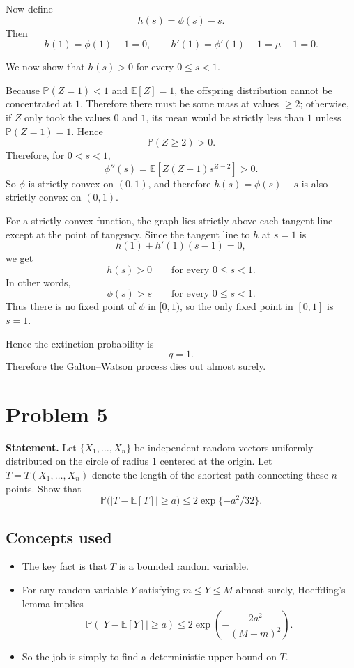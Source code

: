 \documentclass[11pt]{article}
\newcommand{\EE}{\mathbb{E}}
\newcommand{\PP}{\mathbb{P}}
\begin{document}
Now define
\[
h(s)=\phi(s)-s.
\]
Then
\[
h(1)=\phi(1)-1=0,
\qquad
h'(1)=\phi'(1)-1=\mu-1=0.
\]

We now show that $h(s)>0$ for every $0\le s<1$.

Because $\PP(Z=1)<1$ and $\EE[Z]=1$, the offspring distribution cannot be concentrated at
$1$. Therefore there must be some mass at values $\ge 2$; otherwise, if $Z$ only took the
values $0$ and $1$, its mean would be strictly less than $1$ unless $\PP(Z=1)=1$.
Hence
\[
\PP(Z\ge 2)>0.
\]
Therefore, for $0<s<1$,
\[
\phi''(s)=\EE[Z(Z-1)s^{Z-2}] > 0.
\]
So $\phi$ is strictly convex on $(0,1)$, and therefore $h(s)=\phi(s)-s$ is also strictly
convex on $(0,1)$.

For a strictly convex function, the graph lies strictly above each tangent line except at the
point of tangency. Since the tangent line to $h$ at $s=1$ is
\[
h(1)+h'(1)(s-1)=0,
\]
we get
\[
h(s)>0 \qquad \text{for every } 0\le s<1.
\]
In other words,
\[
\phi(s)>s \qquad \text{for every } 0\le s<1.
\]
Thus there is no fixed point of $\phi$ in $[0,1)$, so the only fixed point in $[0,1]$ is
$s=1$.

Hence the extinction probability is
\[
q=1.
\]
Therefore the Galton--Watson process dies out almost surely.

\section*{Problem 5}

\textbf{Statement.} Let $\{X_1,\dots,X_n\}$ be independent random vectors uniformly distributed
on the circle of radius $1$ centered at the origin. Let $T=T(X_1,\dots,X_n)$ denote the
length of the shortest path connecting these $n$ points. Show that
\[
\PP\bigl(|T-\EE[T]|\ge a\bigr)\le 2\exp\{-a^2/32\}.
\]

\subsection*{Concepts used}

\begin{itemize}
\item The key fact is that $T$ is a bounded random variable.
\item For any random variable $Y$ satisfying $m\le Y\le M$ almost surely, Hoeffding's lemma
      implies
      \[
      \PP(|Y-\EE[Y]|\ge a)\le 2\exp\!\left(-\frac{2a^2}{(M-m)^2}\right).
      \]
\item So the job is simply to find a deterministic upper bound on $T$.
\end{itemize}
\end{document}
